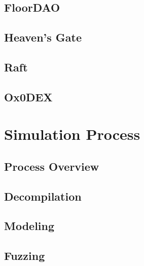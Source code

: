 \chapter{FloorDAO} \label{ch:case-study-floor-dao}

\chapter{Heaven's Gate} \label{ch:case-study-heavens-gate}

\chapter{Raft} \label{ch:case-study-raft}

\chapter{Ox0DEX} \label{ch:case-study-0x0dex}



\part{Simulation Process} \label{sec:simulation-process}
\chapter{Process Overview} \label{ch:process-overview}

\chapter{Decompilation} \label{ch:decompilation}

\chapter{Modeling} \label{ch:modeling}

\chapter{Fuzzing} \label{ch:fuzzing}


